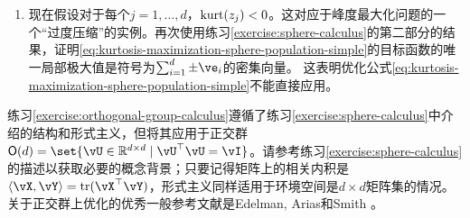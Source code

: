 \documentclass[../../book-main.tex]{subfiles}
\begin{document}
\begin{exercise}
\begin{enumerate}
        \item 现在假设对于每个$j =1, \dots, d$，$\mathop{\mathrm{kurt}}(z_j) < 0$。这对应于峰度最大化问题的一个“过度压缩”的实例。再次使用练习\ref{exercise:sphere-calculus}的第二部分的结果，证明\eqref{eq:kurtosis-maximization-sphere-population-simple}的目标函数的唯一局部极大值是符号为$\sum_{i=1}^d \pm \ve_i$的密集向量。
        这表明优化公式\eqref{eq:kurtosis-maximization-sphere-population-simple}不能直接应用。
    \end{enumerate}
\end{exercise}

\begin{exercise}\label{exercise:fast-ica-convergence}
\end{exercise}


练习\ref{exercise:orthogonal-group-calculus}遵循了练习\ref{exercise:sphere-calculus}中介绍的结构和形式主义，但将其应用于正交群$\O(d) = \set{\vU \in \R^{d \times d} \given \vU^\top \vU = \vI}$。请参考练习\ref{exercise:sphere-calculus}的描述以获取必要的概念背景；只要记得矩阵上的相关内积是$\ip{\vX}{\vY} = \tr(\vX^\top \vY)$，形式主义同样适用于环境空间是$d \times d$矩阵集的情况。关于正交群上优化的优秀一般参考文献是Edelman, Arias和Smith \cite{Edelman1998-lg}。
\end{document}
